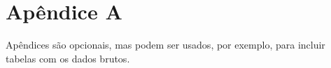 \appendix
\chapter{Apêndice A}
Apêndices são opcionais, mas podem ser usados, por exemplo, para incluir tabelas com os dados brutos.
